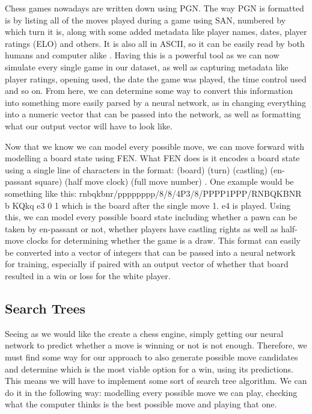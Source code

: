 \documentclass[12pt]{article}
\begin{document}
    Chess games nowadays are written down using PGN. The way PGN is formatted is by listing all of the moves played during a game using SAN, numbered by which turn it is, along with some added metadata like player names, dates, player ratings (ELO) and others. It is also all in ASCII, so it can be easily read by both humans and computer alike \cite{pgnrules}. Having this is a powerful tool as we can now simulate every single game in our dataset, as well as capturing metadata like player ratings, opening used, the date the game was played, the time control used and so on. From here, we can determine some way to convert this information into something more easily parsed by a neural network, as in changing everything into a numeric vector that can be passed into the network, as well as formatting what our output vector will have to look like.

    Now that we know we can model every possible move, we can move forward with modelling a board state using FEN. What FEN does is it encodes a board state using a single line of characters in the format: (board) (turn) (castling) (en-passant square) (half move clock) (full move number) \cite{pgnrules}. One example would be something like this: rnbqkbnr/pppppppp/8/8/4P3/8/PPPP1PPP/RNBQKBNR b KQkq e3 0 1 which is the board after the single move 1. e4 is played. Using this, we can model every possible board state including whether a pawn can be taken by en-passant or not, whether players have castling rights as well as half-move clocks for determining whether the game is a draw. This format can easily be converted into a vector of integers that can be passed into a neural network for training, especially if paired with an output vector of whether that board resulted in a win or loss for the white player. 

    \subsection{Search Trees}

    Seeing as we would like the create a chess engine, simply getting our neural network to predict whether a move is winning or not is not enough. Therefore, we must find some way for our approach to also generate possible move candidates and determine which is the most viable option for a win, using its predictions. This means we will have to implement some sort of search tree algorithm. We can do it in the following way: modelling every possible move we can play, checking what the computer thinks is the best possible move and playing that one. 
\end{document}
